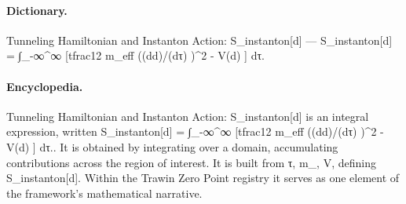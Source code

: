 \paragraph{Dictionary.}
Tunneling Hamiltonian and Instanton Action: S\_instanton[d] — S\_instanton[d] = ∫\_-∞\textasciicircum{}∞ [tfrac12 m\_eff ((dd)/(dτ) )\textasciicircum{}2 - V(d) ] dτ.

\paragraph{Encyclopedia.}
Tunneling Hamiltonian and Instanton Action: S\_instanton[d] is an integral expression, written S\_instanton[d] = ∫\_-∞\textasciicircum{}∞ [tfrac12 m\_eff ((dd)/(dτ) )\textasciicircum{}2 - V(d) ] dτ.. It is obtained by integrating over a domain, accumulating contributions across the region of interest. It is built from τ, m\_, V, defining S\_instanton[d]. Within the Trawin Zero Point registry it serves as one element of the framework's mathematical narrative.
